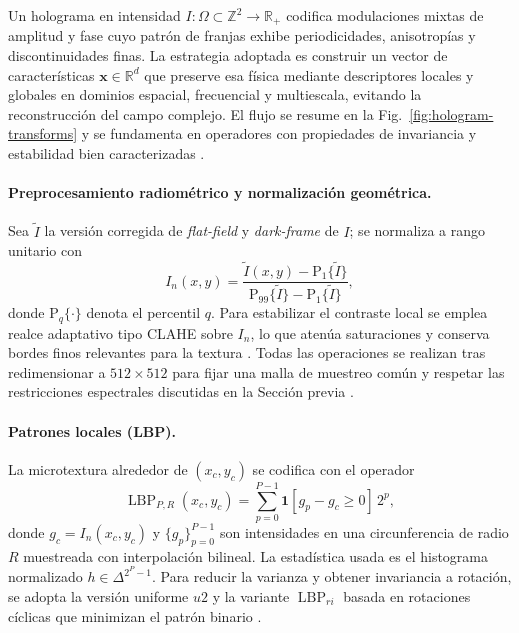 Un holograma en intensidad \(I:\Omega\subset\mathbb{Z}^{2}\to\mathbb{R}_{+}\) codifica modulaciones mixtas de amplitud y fase cuyo patrón de franjas exhibe periodicidades, anisotropías y discontinuidades finas. La estrategia adoptada es construir un vector de características \(\mathbf{x}\in\mathbb{R}^{d}\) que preserve esa física mediante descriptores locales y globales en dominios espacial, frecuencial y multiescala, evitando la reconstrucción del campo complejo. El flujo se resume en la Fig.~\ref{fig:hologram-transforms} y se fundamenta en operadores con propiedades de invariancia y estabilidad bien caracterizadas \cite{Amann2019,OConnor2020,BuitragoDuque2023}.

\paragraph{Preprocesamiento radiométrico y normalización geométrica.}
Sea \(\tilde I\) la versión corregida de \emph{flat-field} y \emph{dark-frame} de \(I\); se normaliza a rango unitario con
\[
I_{n}(x,y)=\frac{\tilde I(x,y)-\mathrm{P}_{1}\{\tilde I\}}
{\mathrm{P}_{99}\{\tilde I\}-\mathrm{P}_{1}\{\tilde I\}},
\]
donde \(\mathrm{P}_{q}\{\cdot\}\) denota el percentil \(q\). Para estabilizar el contraste local se emplea realce adaptativo tipo CLAHE sobre \(I_{n}\), lo que atenúa saturaciones y conserva bordes finos relevantes para la textura \cite{Amann2019,BuitragoDuque2023}. Todas las operaciones se realizan tras redimensionar a \(512\times512\) para fijar una malla de muestreo común y respetar las restricciones espectrales discutidas en la Sección previa \cite{Greenbaum2014}.

\paragraph{Patrones locales (LBP).}
La microtextura alrededor de \((x_{c},y_{c})\) se codifica con el operador
\begin{equation}
\operatorname{LBP}_{P,R}(x_{c},y_{c})=\sum_{p=0}^{P-1}
\mathbf{1}\!\left[g_{p}-g_{c}\ge 0\right]\,2^{p},
\label{eq:lbp}
\end{equation}
donde \(g_{c}=I_{n}(x_{c},y_{c})\) y \(\{g_{p}\}_{p=0}^{P-1}\) son intensidades en una circunferencia de radio \(R\) muestreada con interpolación bilineal. La estadística usada es el histograma normalizado \(h\in\Delta^{2^{P}-1}\). Para reducir la varianza y obtener invariancia a rotación, se adopta la versión uniforme \(u2\) y la variante \(\operatorname{LBP}_{ri}\) basada en rotaciones cíclicas que minimizan el patrón binario \cite{Dheepak2023}.


